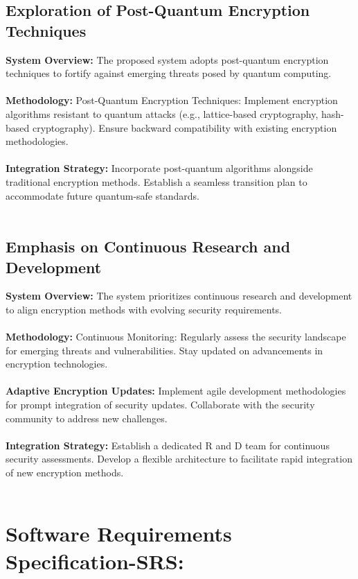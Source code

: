 \subsection{Exploration of Post-Quantum Encryption Techniques}

\textbf{System Overview:}
The proposed system adopts post-quantum encryption techniques to fortify against emerging threats
posed by quantum computing.  
\\
\\
\textbf{Methodology:}
Post-Quantum Encryption Techniques:
Implement encryption algorithms resistant to quantum attacks (e.g., lattice-based cryptography,
hash-based cryptography).
Ensure backward compatibility with existing encryption methodologies.  
\\
\\
\textbf{Integration Strategy: }
Incorporate post-quantum algorithms alongside traditional encryption methods.
Establish a seamless transition plan to accommodate future quantum-safe standards. 
\\
\\
\subsection{Emphasis on Continuous Research and Development}

\textbf{System Overview:}
The system prioritizes continuous research and development to align encryption methods with
evolving security requirements. 
\\
\\
\textbf{Methodology:}
Continuous Monitoring:
Regularly assess the security landscape for emerging threats and vulnerabilities.
Stay updated on advancements in encryption technologies. 
\\
\\
\textbf{Adaptive Encryption Updates:}
Implement agile development methodologies for prompt integration of security updates.
Collaborate with the security community to address new challenges. 
\\
\\
\textbf{Integration Strategy: }
Establish a dedicated R and D team for continuous security assessments.
Develop a flexible architecture to facilitate rapid integration of new encryption methods.  
\\
\\
\newpage

\section{Software Requirements Specification-SRS: }

